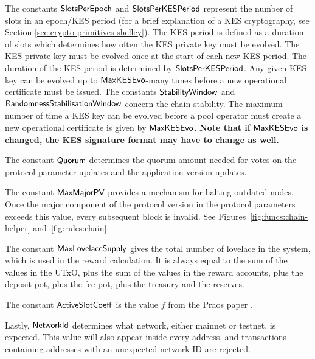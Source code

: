 The constants $\mathsf{SlotsPerEpoch}$ and $\mathsf{SlotsPerKESPeriod}$
represent the number of slots in an epoch/KES period (for a brief explanation
of a KES cryptography, see Section \ref{sec:crypto-primitives-shelley}). The KES period is defined
as a duration of slots which determines how often the KES private key must be evolved. The
KES private key must be evolved once at the start of each new KES period.  The duration of the
KES period is determined by $\mathsf{SlotsPerKESPeriod}$.  Any given KES key can be evolved up
to $\mathsf{MaxKESEvo}$-many times before a new operational certificate must be issued.
The constants $\mathsf{StabilityWindow}$ and $\mathsf{RandomnessStabilisationWindow}$ concern the chain stability.
The maximum number of time a KES key can be evolved before a pool operator
must create a new operational certificate is given by $\mathsf{MaxKESEvo}$.
\textbf{Note that if } $\mathsf{MaxKESEvo}$
\textbf{is changed, the KES signature format may have to change as well.}

The constant $\mathsf{Quorum}$ determines the quorum amount needed for votes on the
protocol parameter updates and the application version updates.

The constant $\mathsf{MaxMajorPV}$ provides a mechanism for halting outdated nodes.
Once the major component of the protocol version in the protocol parameters
exceeds this value, every subsequent block is invalid.
See Figures~\ref{fig:funcs:chain-helper} and~\ref{fig:rules:chain}.

The constant $\mathsf{MaxLovelaceSupply}$ gives the total number of lovelace in the system,
which is used in the reward calculation.
It is always equal to the sum of the values in the UTxO, plus the sum of the
values in the reward accounts, plus the deposit pot, plus the fee pot,
plus the treasury and the reserves.

The constant $\mathsf{ActiveSlotCoeff}$ is the value $f$ from the
Praos paper \cite{ouroboros_praos}.

Lastly, $\mathsf{NetworkId}$ determines what network, either mainnet or testnet, is expected.
This value will also appear inside every address, and transactions
containing addresses with an unexpected network ID are rejected.

